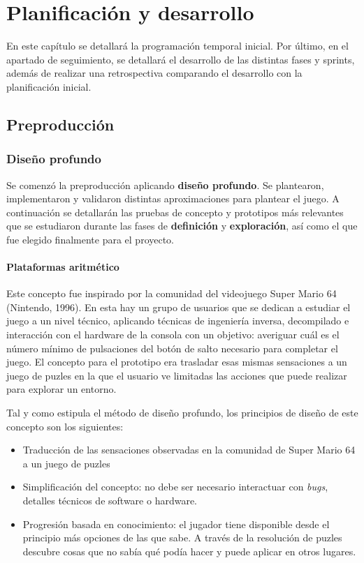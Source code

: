 \chapter{Planificación y desarrollo}
\label{chap:development}

En este capítulo se detallará la programación temporal inicial. Por último, en el apartado de seguimiento, se detallará el desarrollo de las distintas fases y sprints, además de realizar una retrospectiva comparando el desarrollo con la planificación inicial.

\section{Preproducción}

\subsection{Diseño profundo}

Se comenzó la preproducción aplicando \textbf{diseño profundo}. Se plantearon, implementaron y validaron distintas aproximaciones para plantear el juego. A continuación se detallarán las pruebas de concepto y prototipos más relevantes que se estudiaron durante las fases de \textbf{definición} y \textbf{exploración}, así como el que fue elegido finalmente para el proyecto.

\subsubsection{Plataformas aritmético}

Este concepto fue inspirado por la comunidad del videojuego Super Mario 64 (Nintendo, 1996). En esta hay un grupo de usuarios que se dedican a estudiar el juego a un nivel técnico, aplicando técnicas de ingeniería inversa, decompilado e interacción con el hardware de la consola con un objetivo: averiguar cuál es el número mínimo de pulsaciones del botón de salto necesario para completar el juego. El concepto para el prototipo era trasladar esas mismas sensaciones a un juego de puzles en la que el usuario ve limitadas las acciones que puede realizar para explorar un entorno.

Tal y como estipula el método de diseño profundo, los principios de diseño de este concepto son los siguientes:

\begin{itemize}
    \item Traducción de las sensaciones observadas en la comunidad de Super Mario 64 a un juego de puzles
    \item Simplificación del concepto: no debe ser necesario interactuar con \textit{bugs}, detalles técnicos de software o hardware.
    \item Progresión basada en conocimiento: el jugador tiene disponible desde el principio más opciones de las que sabe. A través de la resolución de puzles descubre cosas que no sabía qué podía hacer y puede aplicar en otros lugares.
\end{itemize}

